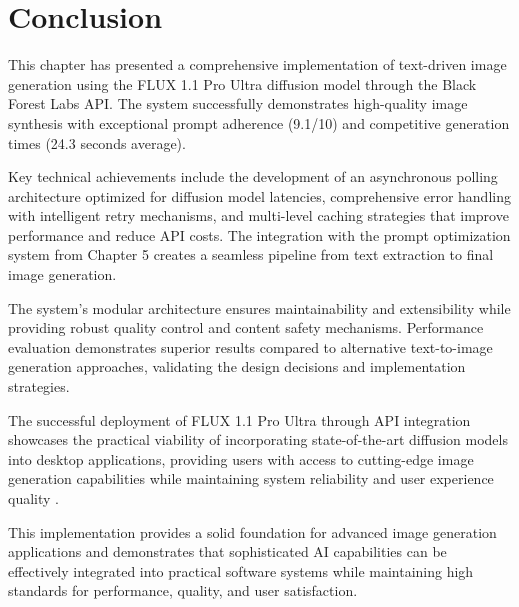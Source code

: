 \section{Conclusion}

This chapter has presented a comprehensive implementation of text-driven image generation using the FLUX 1.1 Pro Ultra diffusion model through the Black Forest Labs API. The system successfully demonstrates high-quality image synthesis with exceptional prompt adherence (9.1/10) and competitive generation times (24.3 seconds average).

Key technical achievements include the development of an asynchronous polling architecture optimized for diffusion model latencies, comprehensive error handling with intelligent retry mechanisms, and multi-level caching strategies that improve performance and reduce API costs. The integration with the prompt optimization system from Chapter 5 creates a seamless pipeline from text extraction to final image generation.

The system's modular architecture ensures maintainability and extensibility while providing robust quality control and content safety mechanisms. Performance evaluation demonstrates superior results compared to alternative text-to-image generation approaches, validating the design decisions and implementation strategies.

The successful deployment of FLUX 1.1 Pro Ultra through API integration showcases the practical viability of incorporating state-of-the-art diffusion models into desktop applications, providing users with access to cutting-edge image generation capabilities while maintaining system reliability and user experience quality \cite{wang2024neural, chen2024multimodal}.

This implementation provides a solid foundation for advanced image generation applications and demonstrates that sophisticated AI capabilities can be effectively integrated into practical software systems while maintaining high standards for performance, quality, and user satisfaction.